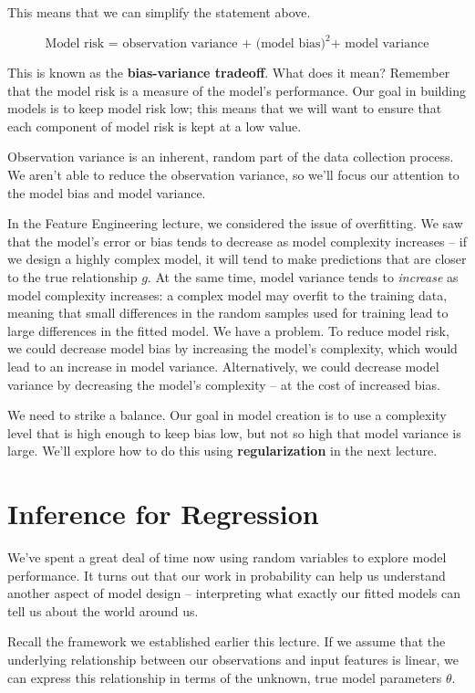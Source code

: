 \documentclass[
  letterpaper,
  DIV=11,
  numbers=noendperiod]{scrreprt}
\begin{document}
This means that we can simplify the statement above.

\[\text{Model risk = observation variance + (model bias)}^2 \text{+ model variance}\]

This is known as the \textbf{bias-variance tradeoff}. What does it mean?
Remember that the model risk is a measure of the model's performance.
Our goal in building models is to keep model risk low; this means that
we will want to ensure that each component of model risk is kept at a
low value.

Observation variance is an inherent, random part of the data collection
process. We aren't able to reduce the observation variance, so we'll
focus our attention to the model bias and model variance.

In the Feature Engineering lecture, we considered the issue of
overfitting. We saw that the model's error or bias tends to decrease as
model complexity increases -- if we design a highly complex model, it
will tend to make predictions that are closer to the true relationship
\(g\). At the same time, model variance tends to \emph{increase} as
model complexity increases: a complex model may overfit to the training
data, meaning that small differences in the random samples used for
training lead to large differences in the fitted model. We have a
problem. To reduce model risk, we could decrease model bias by
increasing the model's complexity, which would lead to an increase in
model variance. Alternatively, we could decrease model variance by
decreasing the model's complexity -- at the cost of increased bias.

We need to strike a balance. Our goal in model creation is to use a
complexity level that is high enough to keep bias low, but not so high
that model variance is large. We'll explore how to do this using
\textbf{regularization} in the next lecture.

\hypertarget{inference-for-regression}{%
\section{Inference for Regression}\label{inference-for-regression}}

We've spent a great deal of time now using random variables to explore
model performance. It turns out that our work in probability can help us
understand another aspect of model design -- interpreting what exactly
our fitted models can tell us about the world around us.

Recall the framework we established earlier this lecture. If we assume
that the underlying relationship between our observations and input
features is linear, we can express this relationship in terms of the
unknown, true model parameters \(\theta\).
\end{document}
